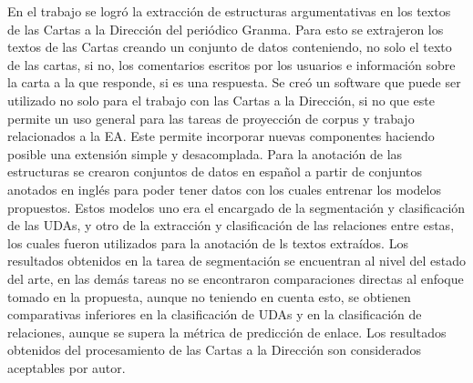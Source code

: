 \begin{conclusions}

    
En el trabajo se logró la extracción de estructuras argumentativas en los textos de las 
Cartas a la Dirección del periódico Granma. Para esto se 
extrajeron los textos de las Cartas creando un conjunto de datos
conteniendo, no solo el texto de las cartas, si no, los comentarios 
escritos por los usuarios e información sobre la carta a la que responde, si es una respuesta.
Se creó un software que puede ser utilizado no solo para el trabajo con las Cartas a la Dirección, si no
que este permite un uso general para las tareas de proyección de corpus y trabajo relacionados a la EA.
Este permite incorporar nuevas componentes haciendo posible una extensión simple y desacomplada. 
Para la anotación de las estructuras se crearon conjuntos de datos en español a partir de conjuntos 
anotados en inglés para poder 
tener datos con los cuales entrenar los modelos propuestos. Estos modelos uno era el encargado 
de la segmentación y clasificación de las UDAs, y otro de la extracción y clasificación de las 
relaciones entre estas, los cuales fueron utilizados para la anotación de ls textos extraídos.
Los resultados obtenidos en la tarea de segmentación se encuentran al nivel del estado del arte,
en las demás tareas no se encontraron comparaciones directas al enfoque tomado en la propuesta,
aunque no teniendo en cuenta esto, se obtienen comparativas inferiores en la clasificación
de UDAs y en la clasificación de relaciones, aunque se supera la métrica de predicción de enlace. 
Los resultados obtenidos del procesamiento de las Cartas a la Dirección son considerados 
aceptables por autor. 

\end{conclusions}
